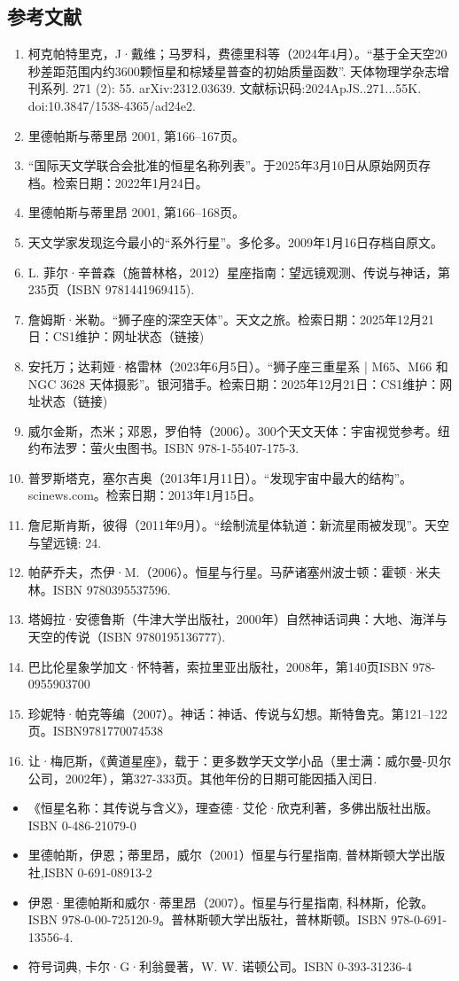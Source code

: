 \subsection{参考文献}
\begin{enumerate}
\item 柯克帕特里克，J·戴维；马罗科，费德里科等（2024年4月）。“基于全天空20秒差距范围内约3600颗恒星和棕矮星普查的初始质量函数”. 天体物理学杂志增刊系列. 271 (2): 55. arXiv:2312.03639. 文献标识码:2024ApJS..271...55K. doi:10.3847/1538-4365/ad24e2.
\item 里德帕斯与蒂里昂 2001, 第166–167页。
\item “国际天文学联合会批准的恒星名称列表”。于2025年3月10日从原始网页存档。检索日期：2022年1月24日。
\item 里德帕斯与蒂里昂 2001, 第166–168页。
\item 天文学家发现迄今最小的“系外行星”。多伦多。2009年1月16日存档自原文。
\item L. 菲尔·辛普森（施普林格，2012）星座指南：望远镜观测、传说与神话，第235页（ISBN 9781441969415).
\item 詹姆斯·米勒。“狮子座的深空天体”。天文之旅。检索日期：2025年12月21日：CS1维护：网址状态（链接)
\item 安托万；达莉娅·格雷林（2023年6月5日）。“狮子座三重星系 | M65、M66 和 NGC 3628 天体摄影”。银河猎手。检索日期：2025年12月21日：CS1维护：网址状态（链接)
\item 威尔金斯，杰米；邓恩，罗伯特（2006）。300个天文天体：宇宙视觉参考。纽约布法罗：萤火虫图书。ISBN 978-1-55407-175-3.
\item 普罗斯塔克，塞尔吉奥（2013年1月11日）。“发现宇宙中最大的结构”。scinews.com。检索日期：2013年1月15日。
\item 詹尼斯肯斯，彼得（2011年9月）。“绘制流星体轨道：新流星雨被发现”。天空与望远镜: 24.
\item 帕萨乔夫，杰伊·M.（2006）。恒星与行星。马萨诸塞州波士顿：霍顿·米夫林。ISBN 9780395537596.
\item 塔姆拉·安德鲁斯（牛津大学出版社，2000年）自然神话词典：大地、海洋与天空的传说（ISBN 9780195136777).
\item 巴比伦星象学加文·怀特著，索拉里亚出版社，2008年，第140页ISBN 978-0955903700
\item 珍妮特·帕克等编（2007）。神话：神话、传说与幻想。斯特鲁克。第121–122页。ISBN9781770074538
\item 让·梅厄斯，《黄道星座》，载于：更多数学天文学小品（里士满：威尔曼-贝尔公司，2002年），第327-333页。其他年份的日期可能因插入闰日.
\end{enumerate}
\begin{itemize}
\item 《恒星名称：其传说与含义》，理查德·艾伦·欣克利著，多佛出版社出版。ISBN 0-486-21079-0
\item 里德帕斯，伊恩；蒂里昂，威尔（2001）恒星与行星指南, 普林斯顿大学出版社,ISBN 0-691-08913-2
\item 伊恩·里德帕斯和威尔·蒂里昂（2007）。恒星与行星指南, 科林斯，伦敦。ISBN 978-0-00-725120-9。普林斯顿大学出版社，普林斯顿。ISBN 978-0-691-13556-4.
\item 符号词典, 卡尔·G·利翁曼著，W. W. 诺顿公司。ISBN 0-393-31236-4
\end{itemize}
